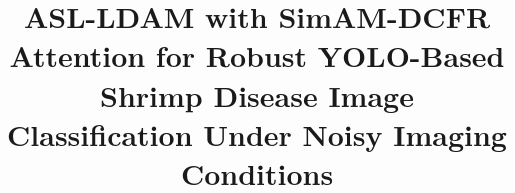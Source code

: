 ﻿\title{ASL-LDAM with SimAM-DCFR Attention for Robust YOLO-Based Shrimp Disease Image Classification Under Noisy Imaging Conditions}


